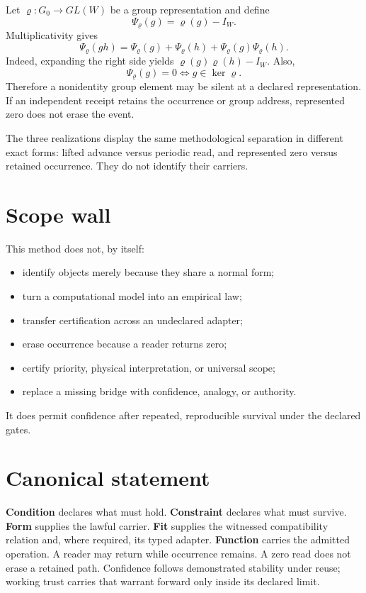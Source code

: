 \documentclass[11pt]{article}
\begin{document}
Let $\varrho:G_0\to GL(W)$ be a group representation and define
\[
\Psi_{\varrho}(g)=\varrho(g)-I_W.
\]
Multiplicativity gives
\[
\boxed{
\Psi_{\varrho}(gh)
=
\Psi_{\varrho}(g)
+
\Psi_{\varrho}(h)
+
\Psi_{\varrho}(g)\Psi_{\varrho}(h).
}
\]
Indeed, expanding the right side yields $\varrho(g)\varrho(h)-I_W$. Also,
\[
\boxed{
\Psi_{\varrho}(g)=0
\Longleftrightarrow
g\in\ker\varrho.
}
\]
Therefore a nonidentity group element may be silent at a declared representation. If an independent receipt retains the occurrence or group address, represented zero does not erase the event.

The three realizations display the same methodological separation in different exact forms: lifted advance versus periodic read, and represented zero versus retained occurrence. They do not identify their carriers.

\section{Scope wall}

This method does not, by itself:
\begin{itemize}
\item identify objects merely because they share a normal form;
\item turn a computational model into an empirical law;
\item transfer certification across an undeclared adapter;
\item erase occurrence because a reader returns zero;
\item certify priority, physical interpretation, or universal scope;
\item replace a missing bridge with confidence, analogy, or authority.
\end{itemize}

It does permit confidence after repeated, reproducible survival under the declared gates.

\section{Canonical statement}

\begin{lawbox}
\textbf{Condition} declares what must hold. \textbf{Constraint} declares what must survive. \textbf{Form} supplies the lawful carrier. \textbf{Fit} supplies the witnessed compatibility relation and, where required, its typed adapter. \textbf{Function} carries the admitted operation. A reader may return while occurrence remains. A zero read does not erase a retained path. Confidence follows demonstrated stability under reuse; working trust carries that warrant forward only inside its declared limit.
\end{lawbox}
\end{document}
